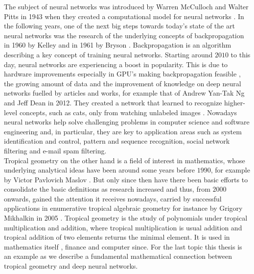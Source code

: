 \documentclass{article}
\theoremstyle{definition}
\begin{document}
The subject of neural networks was introduced by Warren McCulloch and Walter Pitts in 1943 when they created a computational model for neural networks \cite{mcculloch1943logical}. In the following years, one of the next big steps towards today's state of the art neural networks was the research of the underlying concepts of backpropagation in 1960 by Kelley \cite{kelley1960gradient} and in 1961 by Bryson \cite{bryson1961gradient}. Backpropagation is an algorithm describing a key concept of training neural networks. Starting around $2010$ to this day, neural networks are experiencing a boost in popularity. This is due to hardware improvements especially in GPU's making backpropagation feasible \cite{cirecsan2010deep}, the growing amount of data and the improvement of knowledge on deep neural networks fuelled by articles and works, for example that of Andrew Yan-Tak Ng and Jeff Dean in 2012. They created a network that learned to recognize higher-level concepts, such as cats, only from watching unlabeled images \cite{DBLP:journals/corr/abs-1112-6209}. Nowadays neural networks help solve challenging problems in computer science and software engineering and, in particular, they are key to application areas such as system identification and control, pattern and sequence recognition, social network filtering and e-mail spam filtering. \\

Tropical geometry on the other hand is a field of interest in mathematics, whose underlying analytical ideas have been around some years before $1990$, for example by Victor Pavlovich Maslov \cite{maslov1985new}. But only since then have there been basic efforts to consolidate the basic definitions as research increased and thus, from $2000$ onwards, gained the attention it receives nowadays, carried by successful applications in enumerative tropical algebraic geometry for instance by Grigory Mikhalkin in 2005 \cite{mikhalkin2005enumerative}. 
Tropical geometry is the study of polynomials under tropical multiplication and addition, where tropical multiplication is usual addition and tropical addition of two elements returns the minimal element. It is used in mathematics itself \cite{krivulin2014tropical}, finance \cite{klemperer2009new} and computer since. For the last topic this thesis is an example as we describe a fundamental mathematical connection between tropical geometry and deep neural networks. \\
\end{document}
